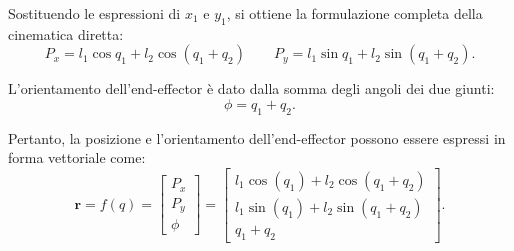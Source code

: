 \documentclass[11pt, a4paper]{report}
\begin{document}
Sostituendo le espressioni di \( x_1 \) e \( y_1 \), si ottiene la formulazione completa della cinematica diretta:
\[
    P_x = l_1 \cos q_1 + l_2 \cos (q_1 + q_2) \qquad
    P_y = l_1 \sin q_1 + l_2 \sin (q_1 + q_2).
\]

L'orientamento dell'end-effector è dato dalla somma degli angoli dei due giunti:
\[
    \phi = q_1 + q_2.
\]

Pertanto, la posizione e l'orientamento dell'end-effector possono essere espressi in forma vettoriale come:
\[
    \mathbf{r} = f(q) =
    \begin{bmatrix}
        P_x \\
        P_y \\
        \phi
    \end{bmatrix}
    =
    \begin{bmatrix}
        l_1 \cos(q_1) + l_2 \cos (q_1 + q_2) \\
        l_1 \sin(q_1) + l_2 \sin (q_1 + q_2) \\
        q_1 + q_2
    \end{bmatrix}.
\]

\newpage
\end{document}
